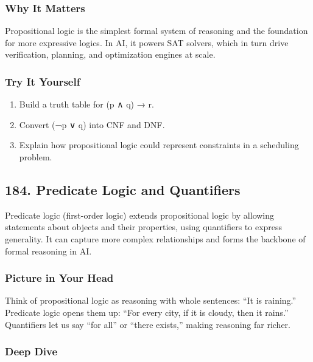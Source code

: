 \documentclass[
  letterpaper,
  DIV=11,
  numbers=noendperiod]{scrreprt}
\providecommand{\tightlist}{%
  \setlength{\itemsep}{0pt}\setlength{\parskip}{0pt}}
\begin{document}
\subsubsection{Why It Matters}\label{why-it-matters-80}

Propositional logic is the simplest formal system of reasoning and the
foundation for more expressive logics. In AI, it powers SAT solvers,
which in turn drive verification, planning, and optimization engines at
scale.

\subsubsection{Try It Yourself}\label{try-it-yourself-182}

\begin{enumerate}
\def\labelenumi{\arabic{enumi}.}
\tightlist
\item
  Build a truth table for (p ∧ q) → r.
\item
  Convert (¬p ∨ q) into CNF and DNF.
\item
  Explain how propositional logic could represent constraints in a
  scheduling problem.
\end{enumerate}

\subsection{184. Predicate Logic and
Quantifiers}\label{predicate-logic-and-quantifiers}

Predicate logic (first-order logic) extends propositional logic by
allowing statements about objects and their properties, using
quantifiers to express generality. It can capture more complex
relationships and forms the backbone of formal reasoning in AI.

\subsubsection{Picture in Your Head}\label{picture-in-your-head-183}

Think of propositional logic as reasoning with whole sentences: ``It is
raining.'' Predicate logic opens them up: ``For every city, if it is
cloudy, then it rains.'' Quantifiers let us say ``for all'' or ``there
exists,'' making reasoning far richer.

\subsubsection{Deep Dive}\label{deep-dive-183}
\end{document}
